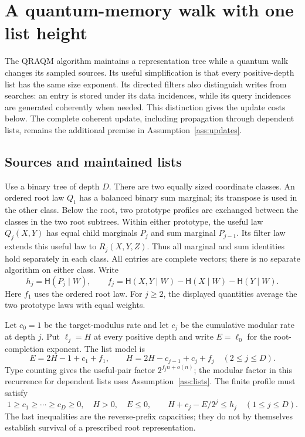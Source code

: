 \documentclass[10pt,a4paper]{article}
\theoremstyle{definition}
\newcommand{\HH}{\mathsf H}
\begin{document}
\section{A quantum-memory walk with one list height}
\label{sec:qraqm}

The QRAQM algorithm maintains a representation tree while a quantum walk
changes its sampled sources. Its useful simplification is that every
positive-depth list has the same size exponent. Its directed filters also
distinguish writes from searches: an entry is stored under its data
incidences, while its query incidences are generated coherently when
needed. This distinction gives the update costs below. The complete
coherent update, including propagation through dependent lists, remains
the additional premise in Assumption~\ref{ass:updates}.

\subsection{Sources and maintained lists}

Use a binary tree of depth $D$. There are two equally sized coordinate
classes. An ordered root law $Q_1$ has a balanced binary sum marginal;
its transpose is used in the other class. Below the root, two prototype
profiles are exchanged between the classes in the two root subtrees.
Within either prototype, the useful law $Q_j(X,Y)$ has equal child
marginals $P_j$ and sum marginal $P_{j-1}$. Its filter law extends this
useful law to $R_j(X,Y,Z)$. Thus all marginal and sum identities hold
separately in each class. All entries are complete vectors; there is no
separate algorithm on either class. Write
\[
 h_j=\HH(P_j\mid W),\qquad
 f_j=\HH(X,Y\mid W)-\HH(X\mid W)-\HH(Y\mid W).
\]
Here $f_1$ uses the ordered root law. For $j\ge2$, the displayed
quantities average the two prototype laws with equal weights.

Let $c_0=1$ be the target-modulus rate and let $c_j$ be the cumulative
modular rate at depth $j$. Put $\ell_j=H$ at every positive depth and
write $E=\ell_0$ for the root-completion exponent. The list model is
\begin{equation}
 E=2H-1+c_1+f_1,\qquad
 H=2H-c_{j-1}+c_j+f_j\quad(2\le j\le D).
 \label{qraqm:recurrence}
\end{equation}
Type counting gives the useful-pair factor $2^{f_jn+o(n)}$; the modular
factor in this recurrence for dependent lists uses
Assumption~\ref{ass:lists}. The finite profile must satisfy
\begin{equation}
 1\ge c_1\ge\cdots\ge c_D\ge0,\quad H>0,\quad E\le0,
 \qquad H+c_j-E/2^j\le h_j\quad(1\le j\le D).
 \label{qraqm:capacities}
\end{equation}
The last inequalities are the reverse-prefix capacities; they do not
by themselves establish survival of a prescribed root representation.
\end{document}
